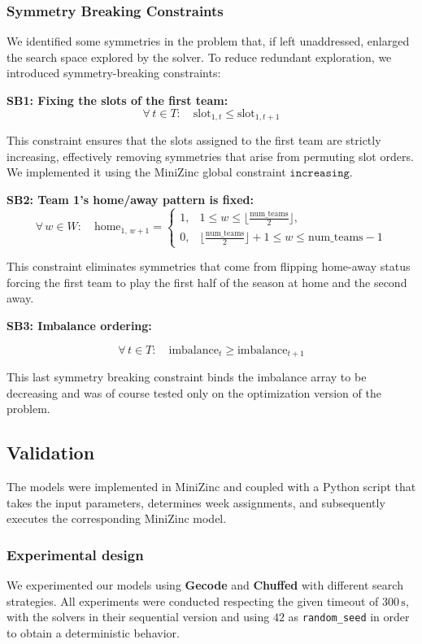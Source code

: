 \documentclass{article}
\begin{document}
\subsubsection*{Symmetry Breaking Constraints}
We identified some symmetries in the problem that, if left unaddressed,  enlarged the search space explored by the solver. To reduce redundant exploration, we introduced symmetry-breaking constraints:

\textbf{SB1: Fixing the slots of the first team:}
\[
\forall\, t \in T:\quad \text{slot}_{1,t} \le \text{slot}_{1,t+1}
\]

This constraint ensures that the slots assigned to the first team are strictly increasing, effectively removing symmetries that arise from permuting slot orders. We implemented it using the MiniZinc global constraint $\mathtt{increasing}.$

\textbf{SB2: Team 1's home/away pattern is fixed:}
\[
\forall\, w \in W:\quad
\text{home}_{1,\, w+1} =
\begin{cases}
1, & 1 \le w \le \lfloor \tfrac{\text{num\_teams}}{2} \rfloor,\\[2mm]
0, & \lfloor \tfrac{\text{num\_teams}}{2} \rfloor + 1 \le w \le \text{num\_teams}-1
\end{cases}
\]

This constraint eliminates symmetries that come from flipping home-away status forcing the first team to play the first half of the season at home and the second away.

\textbf{SB3: Imbalance ordering:}  

\[
\forall\, t \in T:\quad \text{imbalance}_t \ge \text{imbalance}_{t+1}
\]

This last symmetry breaking constraint binds the imbalance array to be decreasing and was of course tested only on the optimization version of the problem.

\subsection{Validation}
The models were implemented in MiniZinc and coupled with a Python script that takes the input parameters, determines week assignments, and subsequently executes the corresponding MiniZinc model.

\subsubsection{Experimental design}
We experimented our models using \textbf{Gecode} and \textbf{Chuffed} with different search strategies. All experiments were conducted respecting the given timeout of $300\,\mathrm{s}$, with the solvers in their sequential version and using $42$ as \texttt{random\_seed} in order to obtain a deterministic behavior.
\end{document}
